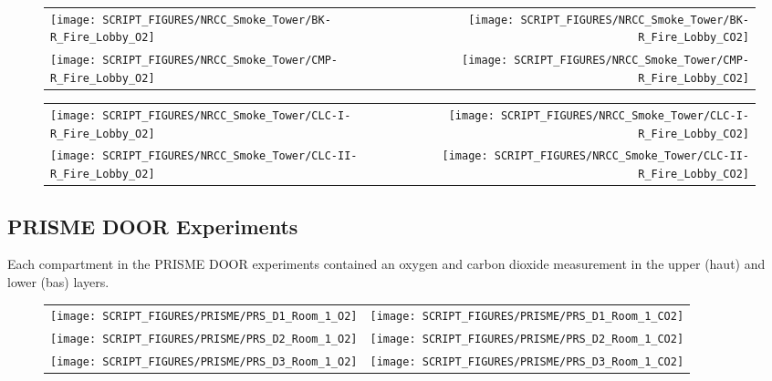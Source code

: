 \begin{figure}[!ht]
\begin{tabular*}{\textwidth}{l@{\extracolsep{\fill}}r}
\texttt{[image: SCRIPT\_FIGURES/NRCC\_Smoke\_Tower/BK-R\_Fire\_Lobby\_O2]} &
\texttt{[image: SCRIPT\_FIGURES/NRCC\_Smoke\_Tower/BK-R\_Fire\_Lobby\_CO2]} \\
\texttt{[image: SCRIPT\_FIGURES/NRCC\_Smoke\_Tower/CMP-R\_Fire\_Lobby\_O2]} &
\texttt{[image: SCRIPT\_FIGURES/NRCC\_Smoke\_Tower/CMP-R\_Fire\_Lobby\_CO2]} 
\end{tabular*}
\label{NRCC_Smoke_Tower_O2_CO2_1}
\end{figure}

\begin{figure}[!ht]
\begin{tabular*}{\textwidth}{l@{\extracolsep{\fill}}r}
\texttt{[image: SCRIPT\_FIGURES/NRCC\_Smoke\_Tower/CLC-I-R\_Fire\_Lobby\_O2]} &
\texttt{[image: SCRIPT\_FIGURES/NRCC\_Smoke\_Tower/CLC-I-R\_Fire\_Lobby\_CO2]} \\
\texttt{[image: SCRIPT\_FIGURES/NRCC\_Smoke\_Tower/CLC-II-R\_Fire\_Lobby\_O2]} &
\texttt{[image: SCRIPT\_FIGURES/NRCC\_Smoke\_Tower/CLC-II-R\_Fire\_Lobby\_CO2]}
\end{tabular*}
\label{NRCC_Smoke_Tower_O2_CO2_2}
\end{figure}


\clearpage

\subsection{PRISME DOOR Experiments}

Each compartment in the PRISME DOOR experiments contained an oxygen and carbon dioxide measurement in the upper (haut) and lower (bas) layers.

\begin{figure}[!ht]
\begin{tabular*}{\textwidth}{l@{\extracolsep{\fill}}r}
\texttt{[image: SCRIPT\_FIGURES/PRISME/PRS\_D1\_Room\_1\_O2]} &
\texttt{[image: SCRIPT\_FIGURES/PRISME/PRS\_D1\_Room\_1\_CO2]} \\
\texttt{[image: SCRIPT\_FIGURES/PRISME/PRS\_D2\_Room\_1\_O2]} &
\texttt{[image: SCRIPT\_FIGURES/PRISME/PRS\_D2\_Room\_1\_CO2]} \\
\texttt{[image: SCRIPT\_FIGURES/PRISME/PRS\_D3\_Room\_1\_O2]} &
\texttt{[image: SCRIPT\_FIGURES/PRISME/PRS\_D3\_Room\_1\_CO2]}
\end{tabular*}
\label{PRISME_Gas_1}
\end{figure}


